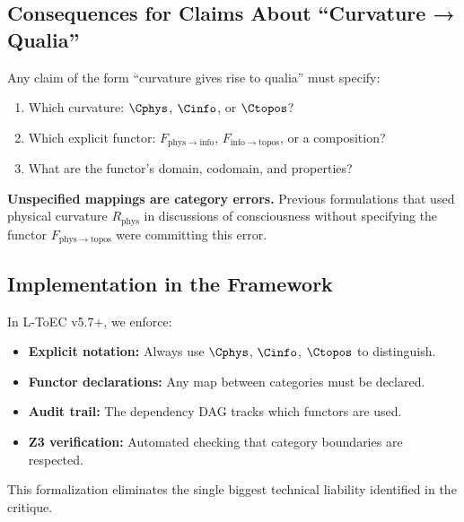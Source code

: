 \subsection{Consequences for Claims About ``Curvature → Qualia''}

Any claim of the form ``curvature gives rise to qualia'' must specify:
\begin{enumerate}
    \item Which curvature: $\Cphys$, $\Cinfo$, or $\Ctopos$?
    \item Which explicit functor: $F_{\mathrm{phys\to info}}$, $F_{\mathrm{info\to topos}}$, or a composition?
    \item What are the functor's domain, codomain, and properties?
\end{enumerate}

\textbf{Unspecified mappings are category errors.} Previous formulations that used physical curvature $R_{\mathrm{phys}}$ in discussions of consciousness without specifying the functor $F_{\mathrm{phys\to topos}}$ were committing this error.

\subsection{Implementation in the Framework}

In L-ToEC v5.7+, we enforce:
\begin{itemize}
    \item \textbf{Explicit notation:} Always use $\Cphys$, $\Cinfo$, $\Ctopos$ to distinguish.
    \item \textbf{Functor declarations:} Any map between categories must be declared.
    \item \textbf{Audit trail:} The dependency DAG tracks which functors are used.
    \item \textbf{Z3 verification:} Automated checking that category boundaries are respected.
\end{itemize}

This formalization eliminates the single biggest technical liability identified in the critique.
